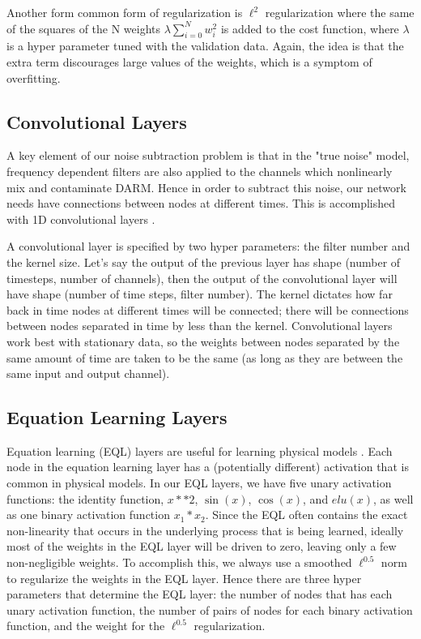 \begin{refsection}
Another form common form of regularization is $\ell^2$ regularization where the same of the squares of the N weights $\lambda \sum_{i=0}^N w_i^2$ is added to the cost function, where $\lambda$ is a hyper parameter tuned with the validation data. Again, the idea is that the extra term discourages large values of the weights, which is a symptom of  overfitting.

\subsection{Convolutional Layers}
A key element of our noise subtraction problem is that in the "true noise" model, frequency dependent filters are also applied to the channels which nonlinearly mix and contaminate DARM. Hence in order to subtract this noise, our network needs have connections between nodes at different times. This is accomplished with 1D convolutional layers \cite{KIRANYAZ2021107398}. 

A convolutional layer is specified by two hyper parameters: the filter number and the kernel size. Let's say the output of the previous layer has shape (number of timesteps, number of channels), then the output of the convolutional layer will have shape (number of time steps, filter number). The kernel dictates how far back in time nodes at different times will be connected; there will be connections between nodes separated in time by less than the kernel.  Convolutional layers work best with stationary data, so the weights between nodes separated by the same amount of time are taken to be the same (as long as they are between the same input and output channel).

\subsection{Equation Learning Layers}
Equation learning (EQL) layers are useful for learning physical models \cite{kim2020integration}. Each node in the equation learning layer has a (potentially different) activation that is common in physical models. In our EQL layers, we have five unary activation functions: the identity function, $x**2$, $\sin(x)$, $\cos(x)$, and $elu(x)$, as well as one binary activation function $x_1*x_2$. Since the EQL often contains the exact non-linearity that occurs in the underlying process that is being learned, ideally most of the weights in the EQL layer will be driven to zero, leaving only a few non-negligible weights. To accomplish this, we always use a smoothed $\ell^{0.5}$ norm to regularize the weights in the EQL layer.
Hence there are three hyper parameters that determine the EQL layer: the number of nodes that has each unary activation function, the number of pairs of nodes for each binary activation function, and the weight for the $\ell^{0.5}$ regularization.


\end{refsection}
